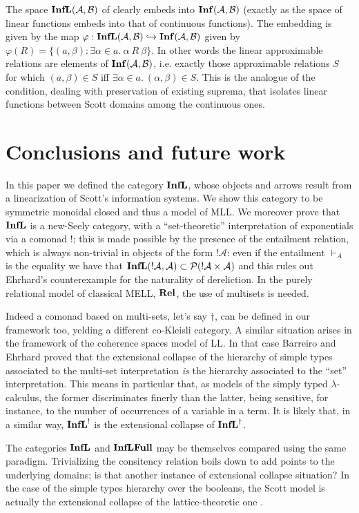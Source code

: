 \documentclass[copyright,creativecommons]{eptcs}
\newcommand{\cA}{\mathcal{A}}
\newcommand{\cB}{\mathcal{B}}
\newcommand{\cP}{\mathcal{P}}
\begin{document}
The space $\Infl(\cA, \cB)$ of clearly embeds into $\Inf(\cA, \cB)$ (exactly as the space of linear functions embeds into that of continuous functions). The embedding is given by the map $\varphi: \Infl(\cA, \cB) \hookrightarrow \Inf(\cA, \cB)$ given by $\varphi(R) = \{(a, \beta) : \exists \alpha \in a.\ \alpha \ R \ \beta \}$. In other words the linear approximable relations are elements of $\Inf(\cA, \cB)$, i.e. exactly those approximable relations $S$ for which $(a, \beta) \in S$ iff $\exists \alpha \in a.\ (\alpha, \beta) \in S$. This is the analogue of the condition, dealing with preservation of existing suprema, that isolates linear functions between Scott domains among the continuous ones. 

\section{Conclusions and future work}

In this paper we defined the category $\mathbf{InfL}$, whose objects and arrows result from a linearization of Scott's information systems. 
We show this category to be symmetric monoidal closed and thus a model of MLL. We moreover prove that $\mathbf{InfL}$ is a new-Seely category, 
with a ``set-theoretic'' interpretation of exponentials via a comonad $!$; this is made possible by the presence of the entailment relation, 
which is always non-trivial in objects of the form $!\cA$:
even if the entailment $\vdash_A$ is the equality we have that $\Infl(!\cA, \cA) \subset \cP(!\cA \times \cA)$ and this rules out Ehrhard's 
counterexample for the naturality of dereliction. In the purely relational model of classical MELL, $\mathbf{Rel}$, 
the use of multisets is needed. 

Indeed a comonad based on multi-sets, let's say $\dag$, can be defined in our framework too, yelding a different co-Kleisli category.
A similar situation arises in the framework of the coherence spaces model of LL. In that case Barreiro and Ehrhard \cite{Barreiro97} 
proved that the extensional collapse of the hierarchy of simple types associated to the multi-set interpretation {\em is} the hierarchy associated to the ``set'' interpretation. This means in particular that, as models of the simply typed $ \lambda$-calculus, the former discriminates finerly than the latter,
being sensitive, for instance, to the number of occurrences of a variable in a term. 
It is likely that, in a similar way, $\mathbf{InfL}^!$ is the extensional collapse of $\mathbf{InfL}^\dag$.

The categories $\mathbf{InfL}$ and $\mathbf{InfLFull}$ may be themselves compared using the same paradigm. Trivializing the consitency relation boils down to add points to the underlying domains; is that another instance of extensional collapse situation? In the case of  the simple types hierarchy  over the booleans, the Scott model is actually the extensional collapse of the lattice-theoretic one \cite{Bucciarelli96}.
\end{document}
